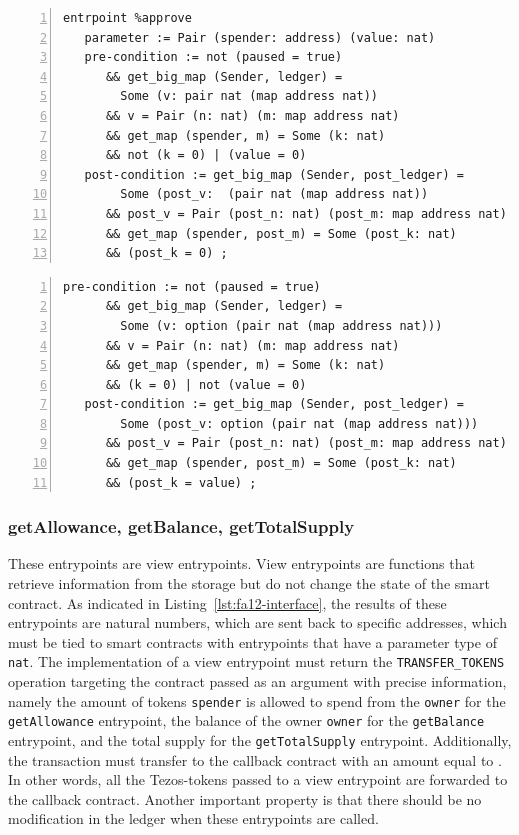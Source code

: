 \documentclass[a4paper,USenglish,cleveref, autoref, thm-restate]{lipics-v2021}
\begin{document}
\begin{lstlisting}[float=tp,captionpos=b,caption={Specification of the \lstinline/approve/ entrypoint (Property 1)},label={lst:specification-approve-1},numbers=left]
entrpoint %approve
   parameter := Pair (spender: address) (value: nat)
   pre-condition := not (paused = true)
      && get_big_map (Sender, ledger) = 
        Some (v: pair nat (map address nat))
      && v = Pair (n: nat) (m: map address nat) 
      && get_map (spender, m) = Some (k: nat) 
      && not (k = 0) | (value = 0)
   post-condition := get_big_map (Sender, post_ledger) = 
        Some (post_v:  (pair nat (map address nat))
      && post_v = Pair (post_n: nat) (post_m: map address nat) 
      && get_map (spender, post_m) = Some (post_k: nat) 
      && (post_k = 0) ;
\end{lstlisting}
\begin{lstlisting}[float=tp,captionpos=b,caption={Specification of the \lstinline/approve/ entrypoint (Property 2)},label={lst:specification-approve-2},numbers=left]
   pre-condition := not (paused = true) 
      && get_big_map (Sender, ledger) = 
        Some (v: option (pair nat (map address nat))) 
      && v = Pair (n: nat) (m: map address nat) 
      && get_map (spender, m) = Some (k: nat) 
      && (k = 0) | not (value = 0)
   post-condition := get_big_map (Sender, post_ledger) = 
        Some (post_v: option (pair nat (map address nat))) 
      && post_v = Pair (post_n: nat) (post_m: map address nat) 
      && get_map (spender, post_m) = Some (post_k: nat) 
      && (post_k = value) ;
\end{lstlisting}

\subsubsection{getAllowance, getBalance,  getTotalSupply}
\label{sec:getall-getb-gett}

These entrypoints are view entrypoints. View entrypoints are functions
that retrieve information from the storage but do not change the state
of the smart contract. As indicated in
Listing~\ref{lst:fa12-interface}, the results of these entrypoints are
natural numbers, which are sent back to specific addresses, which must
be tied to smart contracts with entrypoints that have a parameter type
of \lstinline/nat/. The implementation of a view entrypoint must
return the \lstinline/TRANSFER_TOKENS/ operation targeting the
contract passed as an argument with precise information, namely the
amount of tokens \lstinline/spender/ is allowed to spend from the
\lstinline/owner/ for the \lstinline/getAllowance/ entrypoint, the
balance of the owner \lstinline/owner/ for the \lstinline/getBalance/
entrypoint, and the total supply for the \lstinline/getTotalSupply/
entrypoint. Additionally, the transaction must transfer to the
callback contract with an amount equal to \AMOUNT. In other words, all
the Tezos-tokens passed to a view entrypoint are forwarded to the
callback contract. Another important property is that there should be
no modification in the ledger when these entrypoints are called. 
\end{document}
